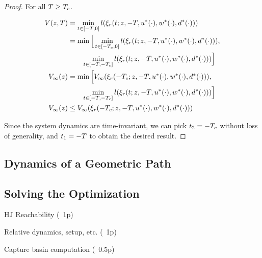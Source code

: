 \begin{proof}
For all $T \ge T_c$.

\begin{equation}
\begin{aligned}
V(z, T) &= \min_{t \in [-T, 0]} l(\xi_r(t; z, -T, u^*(\cdot), w^*(\cdot), d^*(\cdot))) \\
&= \min \Big[ \min_{t \in [-T_c, 0]} l(\xi_r(t; z, -T, u^*(\cdot), w^*(\cdot), d^*(\cdot))), \\
&\qquad\min_{t \in [-T, -T_c]} l(\xi_r(t; z, -T, u^*(\cdot), w^*(\cdot), d^*(\cdot))) \Big] \\
V_\infty(z) &= \min \Big[ V_\infty(\xi_r(-T_c; z, -T, u^*(\cdot), w^*(\cdot), d^*(\cdot))), \\
&\qquad\min_{t \in [-T, -T_c]} l(\xi_r(t; z, -T, u^*(\cdot), w^*(\cdot), d^*(\cdot))) \Big] \\
V_\infty(z) &\le V_\infty(\xi_r(-T_c; z, -T, u^*(\cdot), w^*(\cdot), d^*(\cdot))) \\
\end{aligned}
\end{equation}

Since the system dynamics are time-invariant, we can pick $t_2 = -T_c$ without loss of generality, and $t_1 = -T$ to obtain the desired result.

\end{proof}


\subsection{Dynamics of a Geometric Path}

\subsection{Solving the Optimization}

HJ Reachability (~1p)

Relative dynamics, setup, etc. (~1p)

Capture basin computation (~0.5p)